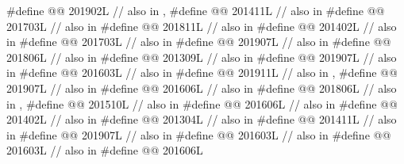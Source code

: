 \begin{codeblock}
#define @@                       201902L // also in , 
#define @@                            201411L // also in 
#define @@                      201703L // also in 
#define @@             201811L // also in 
#define @@                          201402L // also in 
#define @@                      201703L // also in 
#define @@              201907L // also in 
#define @@            201806L // also in 
#define @@                   201309L // also in 
#define @@       201907L // also in 
#define @@                      201603L // also in 
#define @@                           201911L // also in , 
#define @@                             201907L // also in 
#define @@                           201606L // also in 
#define @@           201806L // also in , 
#define @@                    201510L // also in 
#define @@                   201606L // also in 
#define @@             201402L // also in 
#define @@                       201304L // also in 
#define @@                   201411L // also in 
#define @@                    201907L // also in 
#define @@            201603L // also in 
#define @@                   201603L // also in 
#define @@                      201606L

\end{codeblock}
